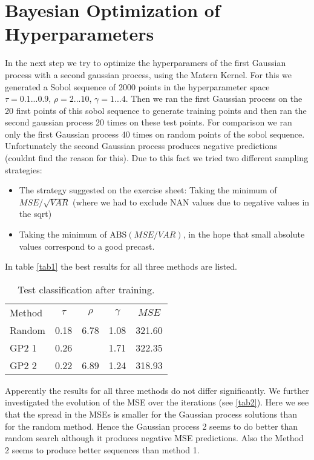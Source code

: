 \documentclass{article}
\begin{document}
\section{Bayesian Optimization of Hyperparameters}

In the next step we try to optimize the hyperparamers of the first Gaussian process with a second gaussian 
process, using the Matern Kernel. 
For this we generated a Sobol sequence of 2000 points in the hyperparameter space $\tau = 0.1 ... 0.9$, $\rho = 2 ... 10$, $\gamma = 1 ... 4$.
Then we ran the first Gaussian process on the 20 first points of this sobol sequence to generate training points and then ran the second gaussian process 20 times on these test points.
For comparison we ran only the first Gaussian process 40 times on random points of the sobol sequence.
Unfortunately the second Gaussian process produces negative predictions (couldnt find the reason for this).
Due to this fact we tried two different sampling strategies:
\begin{itemize}
    \item The strategy suggested on the exercise sheet: Taking the minimum of $MSE / \sqrt{VAR}$ (where we had to exclude NAN values due to negative values in the sqrt)
    \item Taking the minimum of $\textrm{ABS}({MSE / VAR})$, in the hope that small absolute values correspond to a good precast.
\end{itemize}
In table \autoref{tab1} the best results for all three methods are listed.

\begin{table}[h]
	\centering
	\begin{tabular}{l c c c c}
        Method	&	$\tau$	& $\rho$  & $\gamma$&   $MSE$	\\
        Random	&	0.18	& 6.78    & 1.08    &	321.60  \\
        GP2 1	&	0.26	&         & 1.71    &	322.35  \\
        GP2 2	&	0.22	& 6.89    & 1.24    &	318.93  \\
	\end{tabular}
	\caption{Test classification after training.}
	\label{tab1}
\end{table}

Apperently the results for all three methods do not differ significantly.
We further investigated the evolution of the MSE over the iterations (see \autoref{tab2}).
Here we see that the spread in the MSEs is smaller for the Gaussian process solutions than for the random method. 
Hence the Gaussian process 2 seems to do better than random search although it produces negative MSE predictions.
Also the Method 2 seems to produce better sequences than method 1.
\end{document}
